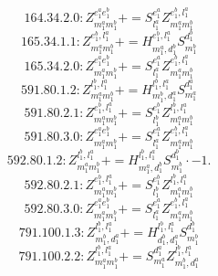 \documentclass[letterpaper,10pt,fleqn,leqno,onecolumn]{article}
\begin{document}
\begin{equation} \;\;\;\;\;\;  164.34.2.0: Z^{e_{1}^{a}e_{1}^{b}}_{m_{1}^{a}m_{1}^{b}}+=S^{e_{1}^{a}}_{l_{1}^{a}}Z^{e_{1}^{b},l_{1}^{a}}_{m_{1}^{a}m_{1}^{b}} \end{equation}
\begin{equation} \;\;\;\;\;\;  165.34.1.1: Z^{e_{1}^{b},l_{1}^{a}}_{m_{1}^{a}m_{1}^{b}}+=H^{e_{1}^{b},l_{1}^{a}}_{m_{1}^{a},d_{1}^{b}}S^{d_{1}^{b}}_{m_{1}^{b}} \end{equation}
\begin{equation} \;\;\;\;\;\;  165.34.2.0: Z^{e_{1}^{a}e_{1}^{b}}_{m_{1}^{a}m_{1}^{b}}+=S^{e_{1}^{a}}_{l_{1}^{a}}Z^{e_{1}^{b},l_{1}^{a}}_{m_{1}^{a}m_{1}^{b}} \end{equation}
\begin{equation} \;\;\;\;\;\;  591.80.1.2: Z^{l_{1}^{b},l_{1}^{a}}_{m_{1}^{a}m_{1}^{b}}+=H^{l_{1}^{b},l_{1}^{a}}_{m_{1}^{b},d_{1}^{a}}S^{d_{1}^{a}}_{m_{1}^{a}} \end{equation}
\begin{equation} \;\;\;\;\;\;  591.80.2.1: Z^{e_{1}^{b},l_{1}^{a}}_{m_{1}^{a}m_{1}^{b}}+=S^{e_{1}^{b}}_{l_{1}^{b}}Z^{l_{1}^{b},l_{1}^{a}}_{m_{1}^{a}m_{1}^{b}} \end{equation}
\begin{equation} \;\;\;\;\;\;  591.80.3.0: Z^{e_{1}^{a}e_{1}^{b}}_{m_{1}^{a}m_{1}^{b}}+=S^{e_{1}^{a}}_{l_{1}^{a}}Z^{e_{1}^{b},l_{1}^{a}}_{m_{1}^{a}m_{1}^{b}} \end{equation}
\begin{equation} \;\;\;\;\;\;  592.80.1.2: Z^{l_{1}^{b},l_{1}^{a}}_{m_{1}^{a}m_{1}^{b}}+=H^{l_{1}^{b},l_{1}^{a}}_{m_{1}^{a},d_{1}^{b}}S^{d_{1}^{b}}_{m_{1}^{b}}\cdot -1. \end{equation}
\begin{equation} \;\;\;\;\;\;  592.80.2.1: Z^{e_{1}^{b},l_{1}^{a}}_{m_{1}^{a}m_{1}^{b}}+=S^{e_{1}^{b}}_{l_{1}^{b}}Z^{l_{1}^{b},l_{1}^{a}}_{m_{1}^{a}m_{1}^{b}} \end{equation}
\begin{equation} \;\;\;\;\;\;  592.80.3.0: Z^{e_{1}^{a}e_{1}^{b}}_{m_{1}^{a}m_{1}^{b}}+=S^{e_{1}^{a}}_{l_{1}^{a}}Z^{e_{1}^{b},l_{1}^{a}}_{m_{1}^{a}m_{1}^{b}} \end{equation}
\begin{equation} \;\;\;\;\;\;  791.100.1.3: Z^{l_{1}^{b},l_{1}^{a}}_{m_{1}^{b},d_{1}^{a}}+=H^{l_{1}^{b},l_{1}^{a}}_{d_{1}^{b},d_{1}^{a}}S^{d_{1}^{b}}_{m_{1}^{b}} \end{equation}
\begin{equation} \;\;\;\;\;\;  791.100.2.2: Z^{l_{1}^{b},l_{1}^{a}}_{m_{1}^{a}m_{1}^{b}}+=S^{d_{1}^{a}}_{m_{1}^{a}}Z^{l_{1}^{b},l_{1}^{a}}_{m_{1}^{b},d_{1}^{a}} \end{equation}
\end{document}

